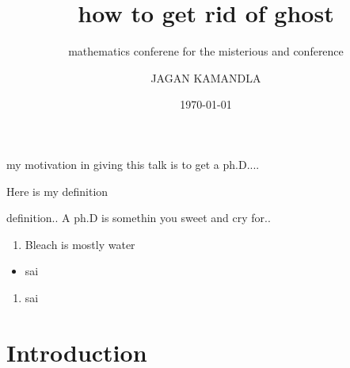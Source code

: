 \documentclass{beamer}
\title{how to get rid of ghost}
\subtitle{mathematics conferene for the misterious and conference}
\author{JAGAN KAMANDLA }
\date{\today}
\begin{document}
\begin{frame}
    \maketitle
\end{frame}
\begin{frame}
    my motivation in giving this talk is to get a ph.D....
\end{frame}
\begin{frame}[t]
    \vspace{2cm}
    Here is my definition
    \begin{block}{definition..}
    A ph.D is somethin you sweet and cry for..
    \end{block}
\end{frame}
\begin{frame}
    \begin{enumerate}
        \item Bleach is mostly water
    \end{enumerate}
    \begin{itemize}
        \item sai
    \end{itemize}
    \begin{enumerate}
        \item sai
    \end{enumerate}
\end{frame}
    
\section{Introduction}
\end{document}
